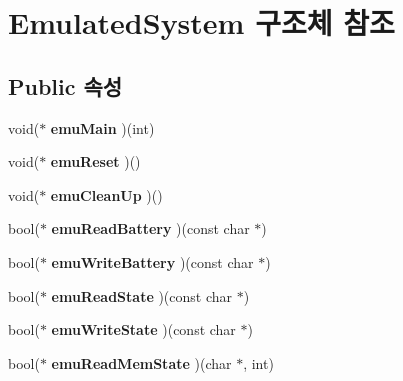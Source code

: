 \hypertarget{struct_emulated_system}{}\section{Emulated\+System 구조체 참조}
\label{struct_emulated_system}
\subsection*{Public 속성}
\begin{DoxyCompactItemize}
\item 
\mbox{\label{struct_emulated_system_a7ff4d7f593baf3463709ea72a6c4a20b}} 
void($\ast$ {\bfseries emu\+Main} )(int)
\item 
\mbox{\label{struct_emulated_system_ae79a9b5e75ec8b74ededbbaceac2d630}} 
void($\ast$ {\bfseries emu\+Reset} )()
\item 
\mbox{\label{struct_emulated_system_ad85b1185af3fdc35c666eb4d0eb1a431}} 
void($\ast$ {\bfseries emu\+Clean\+Up} )()
\item 
\mbox{\label{struct_emulated_system_a8cf069af2706aff38ac0ec1f5ae91a69}} 
bool($\ast$ {\bfseries emu\+Read\+Battery} )(const char $\ast$)
\item 
\mbox{\label{struct_emulated_system_a95f2eb865a1b7866d8eeeb802d36434c}} 
bool($\ast$ {\bfseries emu\+Write\+Battery} )(const char $\ast$)
\item 
\mbox{\label{struct_emulated_system_a1ad8780083ad23c2cbe474fc570745ea}} 
bool($\ast$ {\bfseries emu\+Read\+State} )(const char $\ast$)
\item 
\mbox{\label{struct_emulated_system_a649c6ceaabee941f263a32fa8a73a9c5}} 
bool($\ast$ {\bfseries emu\+Write\+State} )(const char $\ast$)
\item 
\mbox{\label{struct_emulated_system_aeb808d20d5ba0fe3ffa5ec59c798105f}} 
bool($\ast$ {\bfseries emu\+Read\+Mem\+State} )(char $\ast$, int)
\item 
\mbox{\label{struct_emulated_system_a91e29689742db5aa32a73c2f5698605a}} 

\end{DoxyCompactItemize}
